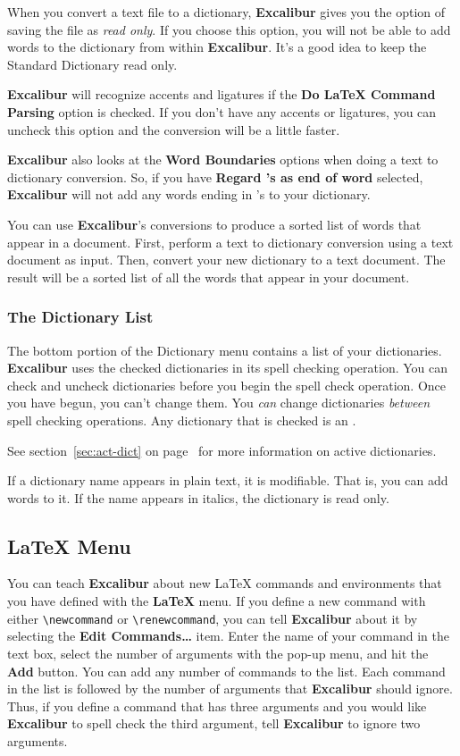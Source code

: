 \documentclass[11pt,titlepage]{article}
\newcommand{\ex}{\textbf{Excalibur}}
\begin{document}
When you convert a text file to a dictionary, \ex{} gives you the
option of saving the file as \emph{read only}.  If you choose this
option, you will not be able to add words to the dictionary from
within \ex.  It's a good idea to keep the Standard Dictionary read
only.

\ex{} will recognize accents and ligatures if the \textbf{Do \LaTeX{}
  Command Parsing} option is checked.  If you don't have any accents
or ligatures, you can uncheck this option and the conversion will be a
little faster.

\ex{} also looks at the \textbf{Word Boundaries} options when doing a
text to dictionary conversion.  So, if you have \textbf{Regard 's as
  end of word} selected, \ex{} will not add any words ending in 's to
your dictionary.

You can use \ex{}'s conversions to produce a sorted list of words that
appear in a document.  First, perform a text to dictionary conversion
using a text document as input.  Then, convert your new dictionary to
a text document.  The result will be a sorted list of all the words
that appear in your document.

\subsubsection{The Dictionary List}

The bottom portion of the Dictionary menu contains a list of your
dictionaries. \ex{} uses the checked dictionaries in its spell
checking operation. You can check and uncheck dictionaries before you
begin the spell check operation. Once you have begun, you can't change
them. You \emph{can} change dictionaries \emph{between} spell checking
operations.  Any dictionary that is checked is an
.
\begin{latexonly}
  See section~\ref{sec:act-dict} on page~\pageref{sec:act-dict} for
  more information on active dictionaries.
\end{latexonly}

If a dictionary name appears in plain text, it is modifiable.  That
is, you can add words to it.  If the name appears in italics, the
dictionary is read only.

\subsection{LaTeX Menu}
\label{sec:latex}

You can teach \ex{} about new \LaTeX{} commands and environments that
you have defined with the \textbf{LaTeX} menu.
If you define a new command with either \verb+\newcommand+ or
\verb+\renewcommand+, you can tell \ex{} about it by selecting the
\textbf{Edit Commands\ldots} item.  Enter the name of your command
in the text box, select the number of arguments with the pop-up menu,
and hit the \textbf{Add} button.  You can add any number of commands
to the list.  Each command in the list is followed by the number of
arguments that \ex{} should ignore.  Thus, if you define a command
that has three arguments and you would like \ex{} to spell check the
third argument, tell \ex{} to ignore two arguments.
\end{document}
